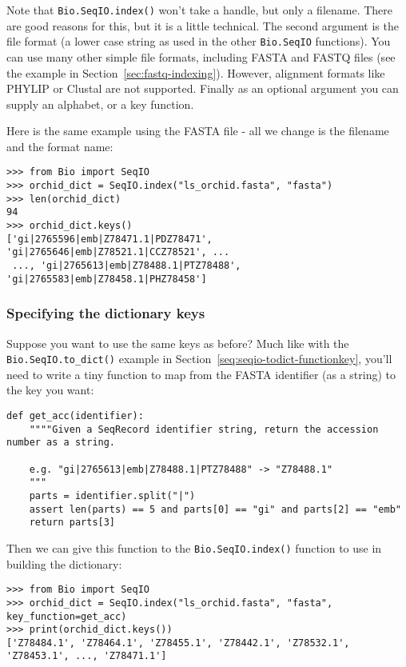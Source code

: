 \noindent Note that \verb|Bio.SeqIO.index()| won't take a handle,
but only a filename. There are good reasons for this, but it is a little
technical. The second argument is the file format (a lower case string as
used in the other \verb|Bio.SeqIO| functions). You can use many other
simple file formats, including FASTA and FASTQ files (see the example in
Section~\ref{sec:fastq-indexing}). However, alignment
formats like PHYLIP or Clustal are not supported. Finally as an optional
argument you can supply an alphabet, or a key function.

Here is the same example using the FASTA file - all we change is the
filename and the format name:

\begin{verbatim}
>>> from Bio import SeqIO
>>> orchid_dict = SeqIO.index("ls_orchid.fasta", "fasta")
>>> len(orchid_dict)
94
>>> orchid_dict.keys()
['gi|2765596|emb|Z78471.1|PDZ78471', 'gi|2765646|emb|Z78521.1|CCZ78521', ...
 ..., 'gi|2765613|emb|Z78488.1|PTZ78488', 'gi|2765583|emb|Z78458.1|PHZ78458']
\end{verbatim}

\subsubsection{Specifying the dictionary keys}
\label{seq:seqio-index-functionkey}

Suppose you want to use the same keys as before? Much like with the
\verb|Bio.SeqIO.to_dict()| example in Section~\ref{seq:seqio-todict-functionkey},
you'll need to write a tiny function to map from the FASTA identifier
(as a string) to the key you want:

\begin{verbatim}
def get_acc(identifier):
    """"Given a SeqRecord identifier string, return the accession number as a string.

    e.g. "gi|2765613|emb|Z78488.1|PTZ78488" -> "Z78488.1"
    """
    parts = identifier.split("|")
    assert len(parts) == 5 and parts[0] == "gi" and parts[2] == "emb"
    return parts[3]
\end{verbatim}

\noindent Then we can give this function to the \verb|Bio.SeqIO.index()|
function to use in building the dictionary:

\begin{verbatim}
>>> from Bio import SeqIO
>>> orchid_dict = SeqIO.index("ls_orchid.fasta", "fasta", key_function=get_acc)
>>> print(orchid_dict.keys())
['Z78484.1', 'Z78464.1', 'Z78455.1', 'Z78442.1', 'Z78532.1', 'Z78453.1', ..., 'Z78471.1']
\end{verbatim}

